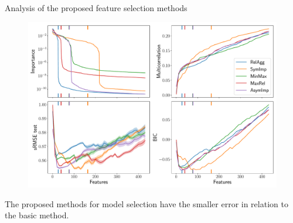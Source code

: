 \documentclass[10pt]{beamer}
\begin{document}
\begin{frame}{Analysis of the proposed feature selection methods}
	\begin{figure}
		\includegraphics[width=0.9\linewidth]{figs/ecog_3_30_metrics.pdf}
		\vspace{-0.2cm}
	\end{figure}
	The proposed methods for model selection have the smaller error in relation to the basic method.
\end{frame}
\end{document}
